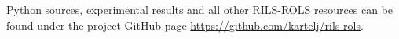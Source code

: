 \documentclass[a4paper,12pt]{elsarticle}
\begin{document}
Python sources, experimental results and all other \textsc{RILS-ROLS} resources can be found under the project GitHub page \url{https://github.com/kartelj/rils-rols}. 




%		
\end{document}
